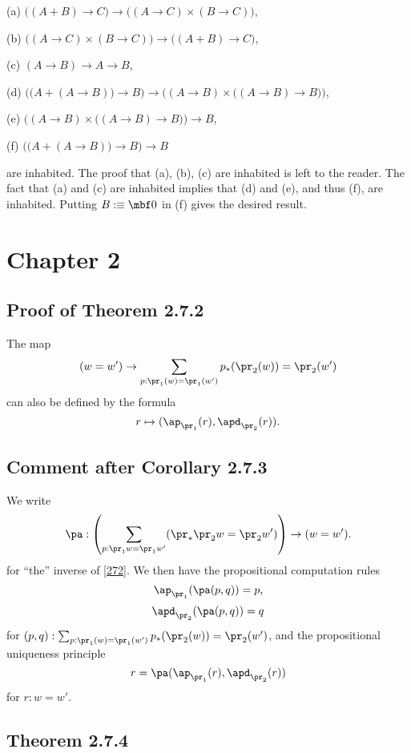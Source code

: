 \documentclass[12pt]{article}
\begin{document}
(a) $\big((A+B)\to C\big)\to\big((A\to C)\times(B\to C)\big)$,

(b) $\big((A\to C)\times(B\to C)\big)\to\big((A+B)\to C\big)$,

(c) $(A\to B)\to A\to B$,

(d) $\Big(\big(A+(A\to B)\big)\to B\Big)\to\Big((A\to B)\times\big((A\to B)\to B\big)\Big)$, 

(e) $\Big((A\to B)\times\big((A\to B)\to B\big)\Big)\to B$,

(f) $\Big(\big(A+(A\to B)\big)\to B\Big)\to B$

\nn are inhabited. The proof that (a), (b), (c) are inhabited is left to the reader. The fact that (a) and (c) are inhabited implies that (d) and (e), and thus (f), are inhabited. Putting $B:\equiv\mbf0$ in (f) gives the desired result.


\section{Chapter 2}

\subsection{Proof of Theorem 2.7.2}

The map 
\begin{equation}\label{272}
(w=w')\to\sum_{p:\pr_1(w)=\pr_1(w')}p_*(\pr_2(w))=\pr_2(w')
\end{equation}
can also be defined by the formula 
$$
r\mapsto(\ap_{\pr_1}(r),\apd_{\pr_2}(r)).
$$ 


\subsection{Comment after Corollary 2.7.3}

We write 
$$
\pa:\left(\sum_{p:\pr_1w=\pr_1w'}(\pr_*\pr_2w=\pr_2w')\right)\to(w=w').
$$ 
for ``the'' inverse of \eqref{272}. We then have the propositional computation rules 
$$
\ap_{\pr_1}(\pa(p,q))=p,
$$
$$
\apd_{\pr_2}(\pa(p,q))=q
$$
for $(p,q):\sum_{p:\pr_1(w)=\pr_1(w')}p_*(\pr_2(w))=\pr_2(w')$, and the propositional uniqueness principle 
$$
r=\pa(\ap_{\pr_1}(r),\apd_{\pr_2}(r))
$$ 
for $r:w=w'$.


\subsection{Theorem 2.7.4}\label{274}
\end{document}
